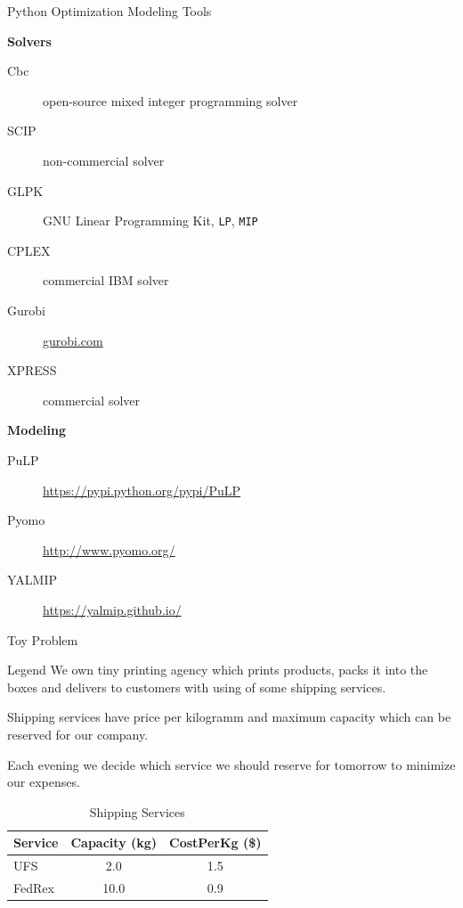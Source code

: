 \documentclass[10pt,utf8,presentation]{beamer}
\begin{document}
\begin{frame}{Python Optimization Modeling Tools}
 
  \alert{\textbf{Solvers}}
  \begin{description}

    \item[Cbc] open-source mixed integer programming solver 
    
    \item[SCIP] non-commercial solver
    
    \item[GLPK] GNU Linear Programming Kit, \texttt{LP}, \texttt{MIP}
  
    \item[CPLEX] commercial IBM solver
    
    \item[Gurobi] \url{gurobi.com}
    
    \item[XPRESS] commercial solver
        
  \end{description}

  \alert{\textbf{Modeling}}
  
  \begin{description}
   \item[PuLP] \url{https://pypi.python.org/pypi/PuLP}
   \item[Pyomo] \url{http://www.pyomo.org/}
   \item[YALMIP] \url{https://yalmip.github.io/}
  \end{description}

 \end{frame}

\begin{frame}{Toy Problem}

\begin{block}{Legend}
  We own tiny printing agency which prints products, packs it into the \alert{boxes}
  and delivers to customers with using of some \alert{shipping services}.
  
  \alert{Shipping services} have \alert{price per kilogramm} and maximum \alert{capacity}
  which can be reserved for our company.
  
  Each evening we decide which service we should reserve for tomorrow to minimize our expenses. 
  
  \begin{table}

    \caption{Shipping Services}
    \begin{tabular}{lcc}
     \toprule
     Service & Capacity (kg) & CostPerKg (\$) \\
     \midrule
     UFS & 2.0 & 1.5 \\
     FedRex & 10.0 & 0.9\\
     \bottomrule
    \end{tabular}

  \end{table}

\end{block} 

\end{frame}
\end{document}
